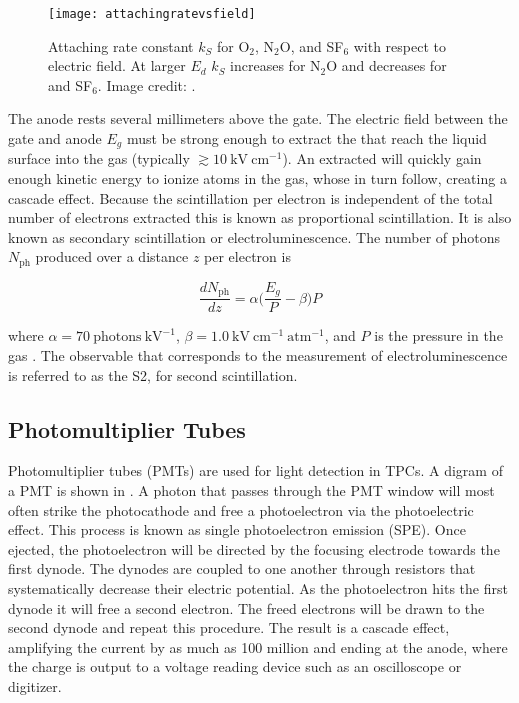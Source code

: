 \begin{figure}
\texttt{[image: attachingratevsfield]}
\caption{Attaching rate constant $k_{S}$ for O$_{2}$, N$_{2}$O, and SF$_{6}$ with respect to electric field.  At
larger $E_d$ $k_{S}$ increases for N$_{2}$O and decreases for \otwo and SF$_{6}$.  Image credit: .}
\label{fig:attachment_rate}
\end{figure}

The anode rests several millimeters above the gate.  The electric field between the gate and anode $E_{g}$ must be strong
enough to extract the \electron that reach the liquid surface into the gas (typically $\gtrsim 10\ \mathrm{kV\ cm^{-1}}$).  An extracted
\electron will quickly gain enough kinetic energy to ionize atoms in the gas,
whose \electron in turn follow, creating a cascade effect.  Because the scintillation per electron is independent of
the total number of electrons extracted this is known as proportional scintillation.  It is also known as secondary scintillation or
electroluminescence.  The number of photons $N_{\mathrm{ph}}$ produced over a distance $z$ per electron is

\begin{equation}
\frac{dN_{\mathrm{ph}}}{dz} = \alpha \bigg( \frac{E_{g}}{P} - \beta \bigg) P
\label{eq:electronlum}
\end{equation}

\noindent where $\alpha = 70\ \mathrm{photons\ kV^{-1}}$, $\beta = 1.0\ \mathrm{kV\ cm^{-1}\ atm^{-1}}$, and $P$ is the pressure in the
gas .  The observable that corresponds to the measurement of electroluminescence is referred to as the S2, for
second scintillation.


\subsection{Photomultiplier Tubes}
\label{subsec:tpcs_pmts}
Photomultiplier tubes (PMTs) are used for light detection in TPCs.  A digram of a PMT is shown in .  A
photon that
passes through the PMT window will most often strike the photocathode and free a photoelectron via the photoelectric effect.  This process
is known as single photoelectron emission (SPE).  Once ejected, the photoelectron will be directed by the focusing electrode towards the
first dynode.  The dynodes are coupled to one another through resistors that systematically decrease their electric potential.  As the
photoelectron hits the first dynode it will free a second electron.  The freed electrons will be drawn to the
second dynode and repeat this procedure.  The result is a cascade effect, amplifying the current by as much as 100 million and ending
at the anode, where the charge is output to a voltage reading device such as an oscilloscope or digitizer.

